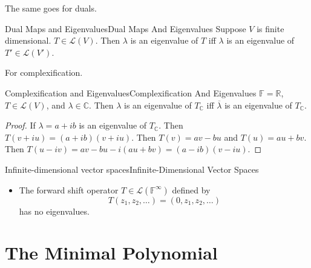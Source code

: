 \documentclass[../main.tex]{subfiles}
\begin{document}
The same goes for duals.
\begin{theorem}{Dual Maps and Eigenvalues}{Dual Maps And Eigenvalues}
Suppose $V$ is finite dimensional.  $T\in \mathscr{L}(V)$. Then $\lambda$ is an eigenvalue of $T$ iff $\lambda$ is an eigenvalue of $T'\in \mathscr{L}(V')$.
\end{theorem}

For complexification.
\begin{theorem}{Complexification and Eigenvalues}{Complexification And Eigenvalues}
$\mathbb{F}=\mathbb{R}$, $T\in \mathscr{L}(V)$, and $\lambda\in \mathbb{C}$. Then $\lambda$ is an eigenvalue of $T_{\mathbb{C}}$ iff $\overline{\lambda}$ is an eigenvalue of $T_{\mathbb{C}}$.
\end{theorem}
\begin{proof}
If $\lambda = a+ib$ is an eigenvalue of $T_{\mathbb{C}}$. Then  $T(v+iu) = (a+ib) (v+iu)$. Then $T(v) = av-bu$ and $T(u) = au+bv$. Then  $T(u-iv) = av-bu - i(au+bv) = (a-ib)(v-iu)$.
\end{proof}

\begin{example}{Infinite-dimensional vector spaces}{Infinite-Dimensional Vector Spaces}
\begin{itemize}
\item The forward shift operator $T\in \mathscr{L}(\mathbb{F}^{\infty })$ defined by
	\begin{equation*}
	T(z_1, z_2, \ldots ) = (0,z_1,z_2, \ldots )
	\end{equation*}
	has no eigenvalues.
\end{itemize}
\end{example}

\section{The Minimal Polynomial}
\end{document}
